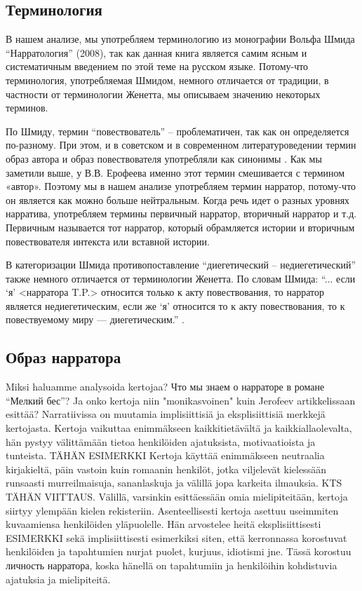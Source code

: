 \documentclass[12pt,a4paper]{article}
\begin{document}
\subsection{Терминология}

В нашем анализе, мы употребляем терминологию из монографии Вольфа Шмида \enquote{Нарратология} (2008), так как данная книга является самим ясным и систематичным введением по этой теме на русском языке. Потому-что терминология, употребляемая Шмидом, немного отличается от традиции, в частности от терминологии Женетта, мы описываем значению некоторых терминов.
  
По Шмиду, термин \enquote{повествователь} -- проблематичен, так как он
определяется по-разному. При этом, и в советском и в современном
литературоведении термин образ автора и образ повествователя употребляли как
синонимы \parencite[67--68]{schmid2008}.  Как мы заметили выше, у В.В.
Ерофеева именно этот термин смешивается с термином «автор». Поэтому мы в нашем анализе
употребляем термин нарратор, потому-что он является как можно больше
нейтральным. Когда речь идет о разных уровнях нарратива, употребляем термины
первичный нарратор, вторичный нарратор и т.д. Первичным называется тот нарратор,
который  обрамляется истории и вторичным повествователя интекста или вставной истории.

В категоризации Шмида противопоставление \enquote{диегетический -- недиегетический} также немного отличается от терминологии Женетта. По словам Шмида: \enquote{... если \enquote{я} <нарратора T.P.> относится только к акту повествования, то нарратор является недиегетическим, если же \enquote{я} относится то к акту повествования, то к повествуемому миру — диегетическим.} \parencite[84]{schmid2008}.

\subsection{Образ нарратора}

Miksi haluamme analysoida kertojaa? 
Что мы знаем о нарраторе в романе \enquote{Мелкий бес}? Ja onko kertoja niin "monikasvoinen" kuin Jerofeev artikkelissaan esittää? Narratiivissa on muutamia implisiittisiä ja eksplisiittisiä merkkejä kertojasta. Kertoja vaikuttaa enimmäkseen kaikkitietävältä ja kaikkiallaolevalta, hän pystyy välittämään tietoa henkilöiden ajatuksista, motivaatioista ja tunteista. TÄHÄN ESIMERKKI
Kertoja käyttää enimmäkseen neutraalia kirjakieltä, päin vastoin kuin romaanin henkilöt, jotka viljelevät kielessään runsaasti murreilmaisuja, sananlaskuja ja välillä jopa karkeita ilmauksia. KTS TÄHÄN VIITTAUS. Välillä, varsinkin esittäessään omia mielipiteitään, kertoja siirtyy ylempään kielen rekisteriin.
Asenteellisesti kertoja asettuu useimmiten kuvaamiensa henkilöiden yläpuolelle. Hän arvostelee heitä eksplisiittisesti ESIMERKKI sekä implisiittisesti esimerkiksi siten, että kerronnassa korostuvat henkilöiden ja tapahtumien nurjat puolet, kurjuus, idiotismi jne. 
Tässä korostuu личность нарратора, koska hänellä on tapahtumiin ja henkilöihin kohdistuvia ajatuksia ja mielipiteitä. 
\end{document}
